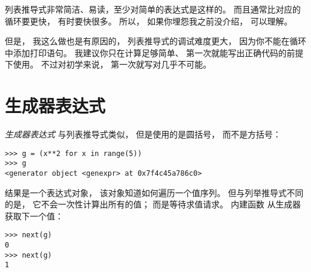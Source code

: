 列表推导式非常简洁、易读，至少对简单的表达式是这样的。  
而且通常比对应的  循环要更快， 有时要快很多。  
所以， 如果你埋怨我之前没介绍， 可以理解。


但是， 我这么做也是有原因的， 列表推导式的调试难度更大， 因为你不能在循环中添加打印语句。  
我建议你只在计算足够简单、 第一次就能写出正确代码的前提下使用。  
不过对初学来说， 第一次就写对几乎不可能。


\section{生成器表达式}


{\em 生成器表达式} 与列表推导式类似， 但是使用的是圆括号， 而不是方括号：

  

\begin{lstlisting}
>>> g = (x**2 for x in range(5))
>>> g
<generator object <genexpr> at 0x7f4c45a786c0>
\end{lstlisting}


结果是一个表达式对象， 该对象知道如何遍历一个值序列。  但与列举推导式不同的是， 它不会一次性计算出所有的值； 而是等待求值请求。  内建函数  从生成器获取下一个值：


\begin{lstlisting}
>>> next(g)
0
>>> next(g)
1
\end{lstlisting}

